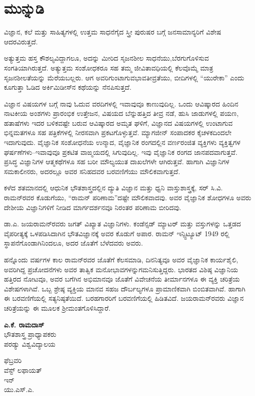 
\chapter*{ಮುನ್ನುಡಿ}

\vskip -6pt

ವಿಜ್ಞಾನ, ಕಲೆ ಮತ್ತು ಸಾಹಿತ್ಯಗಳಲ್ಲಿ ಉತ್ತಮ ಸಾಧನೆಗೈದ ಸ್ತ್ರೀ ಪುರುಷರ ಬಗ್ಗೆ ಜನಸಾಮಾನ್ಯರಿಗೆ ವಿಶೇಷ ಆದರವಿರುತ್ತದೆ.

ಅತ್ಯುತ್ತಮ ಹಸ್ತ ಕೌಶಲ್ಯವಿದ್ದಾಗಲೂ, ಅದನ್ನು ಮೀರಿದ ಸೃಜನಶೀಲ ಸಾಧನೆಯು,\break ಬೆರಗುಗೊಳಿಸುವ ಸಂಗತಿಯಾಗಿರುತ್ತದೆ. ಅತ್ಯುತ್ತಮ ಸಂಶೋಧಕರೂ ಸಹ ತಮ್ಮ ಜೀವಿತಾವಧಿಯಲ್ಲಿ ಕೆಲವೊಮ್ಮೆ ಮಾತ್ರ ಸೃಜನಶೀಲತೆಯನ್ನು ಮೆರೆಯಬಲ್ಲರು. ಆಗ ಅವರಿಗುಂಟಾಗುವ\break ಭಾವತೀವ್ರತೆಯು, ಬೀದಿಗಳಲ್ಲಿ “ಯುರೇಕಾ” ಎಂದು ಕೂಗುತ್ತಾ ಓಡಿದ ಅರ್ಕಿಮಿಡೀಸ್‍ನ ಕಥೆಯನ್ನು ನೆನಪಿಸುತ್ತದೆ.

ವಿಜ್ಞಾನ ವಿಷಯಗಳ ಬಗ್ಗೆ ನಾವು ಓದುವ ವರದಿಗಳಲ್ಲಿ ಇವಾವುವೂ ಕಾಣುವುದಿಲ್ಲ. ಒಂದು ಆವಿಷ್ಕಾರದ ಹಿಂದಿನ ನಾಟಕೀಯ ಅಂಶಗಳು\enginline{-} ಪ್ರಾರಂಭಿಕ ಉತ್ತೇಜನ, ವಿಷಯದ ಬೆನ್ನುಹತ್ತಿದ ತೀವ್ರ ನಡೆ, ಹುಸಿ ಜಾಡುಗಳಲ್ಲಿ ಪಯಣ, ಹತಾಷೆಗಳು ಇದರ ಬಳಿಕವಷ್ಟೇ ಬರುವ ಆವಿಷ್ಕಾರದ ಅಮೃತ ಘಳಿಗೆ, ವಿಜ್ಞಾನದ ವಿಷಯಗಳಲ್ಲಿ ಉಂಟಾಗುವ ಭಿನ್ನಮತಗಳೂ ಸಹ ಪತ್ರಿಕೆಗಳಲ್ಲಿ ನೀರಸವಾಗಿ ಪ್ರಕಟಗೊಳ್ಳುತ್ತವೆ. ಮ್ಯಾಗಜೀನ್ ಸಂಪಾದಕರ ಕೈಚಳಕದಿಂದಲೇ ಇದಾಗುವುದು. ವೈಜ್ಞಾನಿಕ ಸಂಶೋಧನೆಯ ಉನ್ಮಾದ, ವೈಜ್ಞಾನಿಕ ರಂಗದಲ್ಲಿನ ವರ್ಣರಂಜಿತ ವ್ಯಕ್ತಿಗಳು ವ್ಯಕ್ತಿತ್ವಗಳ ಘರ್ಷಣೆಗಳು–ಇವಾವುವೂ ಪ್ರಕಟಿತ ವಾಙ್ಮಯದಲ್ಲಿ ಸಿಗುವುದಿಲ್ಲ. ಇವು ವೈಜ್ಞಾನಿಕ ರಂಗದ ಜಾನಪದವಾಗುತ್ತವೆ. ಪ್ರಸಿದ್ಧ ವಿಜ್ಞಾನಿಗಳ ಆತ್ಮಕಥೆಗಳೂ ಸಹ ಬರೀ ಮೌಲ್ಯಯುತ ದಾಖಲೆಗಳೇ ಆಗಿರುತ್ತವೆ. ಹಾಗಾಗಿ ವಿಜ್ಞಾನಿಗಳ ಸಮಕಾಲೀನರು, ಅದರಲ್ಲೂ ಅವರ ಸನಿಹದವರ ಬರವಣಿಗೆಯು ಮೌಲಿಕವಾಗುತ್ತದೆ.

ಕಳೆದ ಶತಮಾನದಲ್ಲಿ ಆಧುನಿಕ ಭೌತಶಾಸ್ತ್ರದಲ್ಲಿನ ದ್ಯುತಿ ವಿಜ್ಞಾನ ಮತ್ತು ಧ್ವನಿ ವಾಸ್ತುಶಾಸ್ತ್ರಕ್ಕೆ, ಸರ್ ಸಿ.ವಿ. ರಾಮನ್‍ರವರ ಕೊಡುಗೆಯು, “ರಾಮನ್ ಪರಿಣಾಮ”ದಷ್ಟೇ ಮೌಲಿಕವಾದವು. ಅವರ ವೈಜ್ಞಾನಿಕ ಶೋಧಗಳೂ ಅವರು ದೇಶೀಯ ವಿಜ್ಞಾನಿಗಳಿಗೆ ನೀಡಿದ ಮಾರ್ಗದರ್ಶನವೂ ನಿರಂತರ ಪರಿಣಾಮ ಬೀರಿದವು.

ಡಾ.ಎ. ಜಯರಾಮನ್‍ರವರು ಜಗತ್ ವಿಖ್ಯಾತ ವಿಜ್ಞಾನಿಗಳು. ಕಂಡೆನ್ಸಡ್ ಮ್ಯಾಟರ್ ಮತ್ತು ವಸ್ತುಗಳನ್ನು ಒತ್ತಡದ ವೈಪರೀತ್ಯಕ್ಕೆ ಒಳಪಡಿಸಿದಾಗಿನ ಭೌತವಿಜ್ಞಾನಕ್ಕೆ ಅವರ ಕೊಡುಗೆ ಅಪಾರ. ರಾಮನ್ ಇನ್ಸ್ಟಿಟ್ಯೂಟ್ 1949 ರಲ್ಲಿ ಸ್ಥಾಪನೆಗೊಂಡಾಗಿನಿಂದಲೂ, ಅದರ ಜೊತೆಗೆ ಬೆಳೆದವರು ಅವರು.

ಹನ್ನೊಂದು ವರ್ಷಗಳ ಕಾಲ ರಾಮನ್‍ರವರ ಜೊತೆಗೆ ಕೆಲಸಮಾಡಿ, ದಿನನಿತ್ಯವೂ ಅವರ ವೈಜ್ಞಾನಿಕ ಕಾರ್ಯಶೈಲಿ, ಅವರಿಗಿದ್ದ ಪ್ರಚೋದನೆಗಳು ಅವರ ತಾತ್ವಿಕ ಮನೋಭಾವಗಳನ್ನು\break ಗಮನಿಸುತ್ತಿದ್ದರು. ಭಾರತದ ವಿಶಿಷ್ಠ ವಿಜ್ಞಾನಿಯ ಹತ್ತಿರದ ನೋಟವೂ, ಅವರ ಬಗೆಗಿನ ಅಭಿಮಾನವೂ ಜೊತೆಗೆ ವಿವೇಚನೆಯ ತೀರ್ಮಾನಗಳೂ ಈ ವ್ಯಕ್ತಿ ಚರಿತ್ರೆಯ ವಿಶೇಷಗಳಾಗಿವೆ. ಒಬ್ಬ ಶ್ರೇಷ್ಠ ವ್ಯಕ್ತಿಯ ಮಾನವ ಸಹಜ ದೌರ್ಬಲ್ಯಗಳೂ ಪ್ರಾಮಾಣಿಕವಾಗಿ ಬಿಂಬಿತವಾಗಿವೆ. ಹಾಗಾಗಿ ಈ ಬರವಣಿಗೆಯಲ್ಲಿ ಸತ್ಯನಿಷ್ಠತೆಯಿದೆ. ಬರಹಗಾರರಿಗೆ ಬರವಣಿಗೆಯಲ್ಲಿ ಹಿಡಿತವಿದೆ. ಜಯರಾಮನ್‍ರವರು ವಿಜ್ಞಾನ ಚರಿತ್ರೆಯನ್ನು ಈ ಮೂಲಕ ಶ‍್ರೀಮಂತಗೊಳಿಸಿದ್ದಾರೆ.

\begin{flushright}
 \textbf{ಎ.ಕೆ. ರಾಮದಾಸ್}\\
 ಭೌತಶಾಸ್ತ್ರ ಪ್ರಾಧ್ಯಾಪಕರು\\
 ಪರಡ್ಯು ವಿಶ್ವವಿದ್ಯಾಲಯ
\end{flushright}

\begin{flushleft}
  ಫೆಬ್ರವರಿ \\
 ವೆಸ್ಟ್ ಲಫಾಯತ್\\
 ಇನ್ \\
 ಯು.ಎಸ್.ಎ.
\end{flushleft}

\begin{flushright}
\end{flushright}

